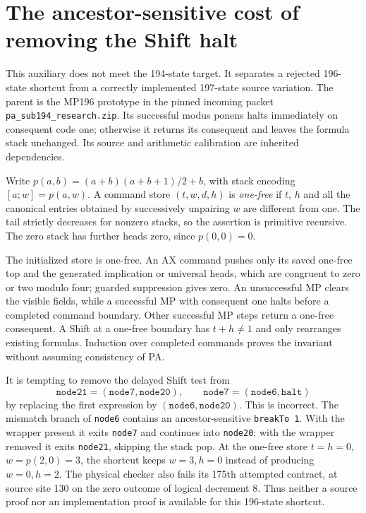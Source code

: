 \section{The ancestor-sensitive cost of removing the Shift halt}
This auxiliary does not meet the 194-state target. It separates a rejected
196-state shortcut from a correctly implemented 197-state source variation.
The parent is the MP196 prototype in the pinned incoming packet
\texttt{pa\_sub194\_research.zip}. Its successful modus ponens halts
immediately on consequent code one; otherwise it returns its consequent
and leaves the formula stack unchanged. Its source and arithmetic
calibration are inherited dependencies.

Write $p(a,b)=(a+b)(a+b+1)/2+b$, with stack encoding
$[a;w]=p(a,w)$. A command store $(t,w,d,h)$ is \emph{one-free} if $t$,
$h$ and all the canonical entries obtained by successively unpairing $w$
are different from one. The tail strictly decreases for nonzero stacks,
so the assertion is primitive recursive. The zero stack has further heads
zero, since $p(0,0)=0$.

The initialized store is one-free. An AX command pushes only its saved
one-free top and the generated implication or universal heads, which are
congruent to zero or two modulo four; guarded suppression gives zero.
An unsuccessful MP clears the visible fields, while a successful MP with
consequent one halts before a completed command boundary. Other successful
MP steps return a one-free consequent. A Shift at a one-free boundary has
$t+h\ne1$ and only rearranges existing formulas. Induction over completed
commands proves the invariant without assuming consistency of PA.

It is tempting to remove the delayed Shift test from
\[
 \mathtt{node21}=(\mathtt{node7},\mathtt{node20}),\qquad
 \mathtt{node7}=(\mathtt{node6},\mathtt{halt})
\]
by replacing the first expression by
$(\mathtt{node6},\mathtt{node20})$. This is incorrect.
The mismatch branch of \texttt{node6} contains an ancestor-sensitive
\texttt{breakTo 1}. With the wrapper present it exits \texttt{node7}
and continues into \texttt{node20}; with the wrapper removed it exits
\texttt{node21}, skipping the stack pop. At the one-free store
$t=h=0$, $w=p(2,0)=3$, the shortcut keeps $w=3,h=0$ instead of
producing $w=0,h=2$. The physical checker also fails its 175th attempted
contract, at source site 130 on the zero outcome of logical decrement 8.
Thus neither a source proof nor an implementation proof is available
for this 196-state shortcut.


